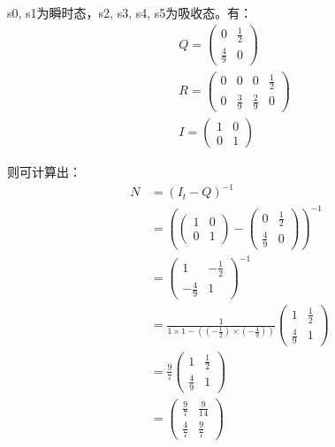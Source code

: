\documentclass[12pt]{article}
\begin{document}
s0, s1为瞬时态，s2, s3, s4, s5为吸收态。有：
\begin{align}
& Q=\begin{pmatrix} 0 & \frac{1}{2} \\ \frac{4}{9} & 0 \end{pmatrix} \\
& R=\begin{pmatrix} 0 & 0 & 0 & \frac{1}{2} \\ 0 & \frac{3}{9}  & \frac{2}{9} & 0\end{pmatrix} \\
& I = \begin{pmatrix} 1 & 0 \\ 0 & 1 \end{pmatrix} 
\end{align}

则可计算出：
\begin{align}
N &=(I_{t} - Q)^{-1} \\
  &=\left( \begin{pmatrix} 1 & 0 \\ 0 & 1 \end{pmatrix} - \begin{pmatrix} 0 & \frac{1}{2} \\ \frac{4}{9} & 0 \end{pmatrix}
\right) ^{-1} \\
  &= \begin{pmatrix} 1 & -\frac{1}{2} \\ -\frac{4}{9} & 1 \end{pmatrix}^{-1} \\
  &= \frac{1}{1 \times 1 - ((-\frac{1}{2}) \times (-\frac{4}{9}))}\begin{pmatrix} 1 & \frac{1}{2} \\ \frac{4}{9} & 1 \end{pmatrix} \\
  &= \frac{9}{7}\begin{pmatrix} 1 & \frac{1}{2} \\ \frac{4}{9} & 1 \end{pmatrix} \\
  &=\begin{pmatrix} \frac{9}{7} & \frac{9}{14} \\ \frac{4}{7} & \frac{9}{7} \end{pmatrix}
\end{align}
\end{document}
